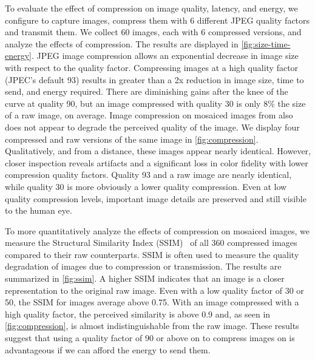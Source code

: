 To evaluate the effect of compression on image quality, latency, and energy, we configure \name to capture images, compress them with 6 different JPEG quality factors and transmit them. We collect 60 images, each with 6 compressed versions, and analyze the effects of compression. 
The results are displayed in \cref{fig:size-time-energy}. 
JPEG image compression allows an exponential decrease in image size with respect to the quality factor.
Compressing images at a high quality factor (JPEC's default 93) results in greater than a 2x reduction in image size, time to send, and energy required. There are diminishing gains after the knee of the curve at quality 90, but an image compressed with quality 30 is only 8\% the size of a raw image, on average. Image compression on mosaiced images from \name also does not appear to degrade the perceived quality of the image. We display four compressed and raw versions of the same image in \cref{fig:compression}. Qualitatively, and from a distance, these images appear nearly identical. However, closer inspection reveals artifacts and a significant loss in color fidelity with lower compression quality factors. Quality 93 and a raw image are nearly identical, while quality 30 is more obviously a lower quality compression. Even at low quality compression levels, important image details are preserved and still visible to the human eye.


To more quantitatively analyze the effects of compression on mosaiced images, we measure the Structural Similarity Index (SSIM)~\cite{wang2004image} of all 360 compressed images compared to their raw counterparts. SSIM is often used to measure the quality degradation of images due to compression or transmission. The results are summarized in \cref{fig:ssim}. A higher SSIM indicates that an image is a closer representation to the original raw image.
Even with a low quality factor of 30 or 50, the SSIM for images average above 0.75. With an image compressed with a high quality factor, the perceived similarity is above 0.9 and, as seen in \cref{fig:compression}, is almost indistinguishable from the raw image. These results suggest that using a quality factor of 90 or above on to compress images on \name is advantageous if we can afford the energy to send them.

